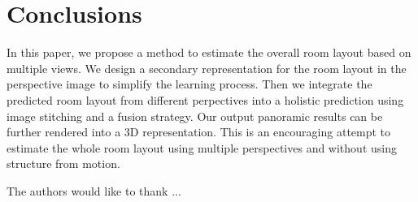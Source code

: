 \section{Conclusions}
In this paper, we propose a method to estimate the overall room layout based on multiple views. We design a secondary representation for the room layout in the perspective image to simplify the learning process. Then we integrate the predicted room layout from different perpectives into a holistic prediction using image stitching and a fusion strategy. Our output panoramic results can be further rendered into a 3D representation. This is an encouraging attempt to estimate the whole room layout using multiple perspectives and without using structure from motion.


\begin{acks}
  The authors would like to thank ...
\end{acks}
